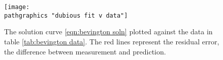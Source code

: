 \begin{figure}[t]
	\texttt{[image: \\pathgraphics "dubious fit v data"]}
	\caption{The solution curve \eqref{eqn:bevington soln} plotted against the data in table \eqref{tab:bevington data}. The red lines represent the residual error, the difference between measurement and prediction.}
	\label{fig:dubious solution}
\end{figure}

\endinput  %